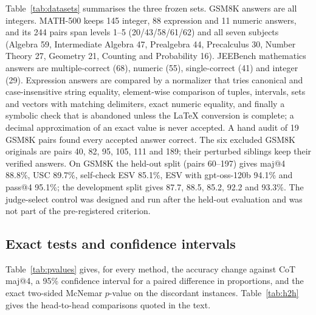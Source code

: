 \documentclass[letterpaper]{article} %
\begin{document}
Table~\ref{tab:datasets} summarises the three frozen sets.
GSM8K answers are all integers. MATH-500 keeps 145 integer, 88 expression and 11 numeric answers, and its 244 pairs span levels 1--5 (20/43/58/61/62) and all seven subjects (Algebra 59, Intermediate Algebra 47, Prealgebra 44, Precalculus 30, Number Theory 27, Geometry 21, Counting and Probability 16). JEEBench mathematics answers are multiple-correct (68), numeric (55), single-correct (41) and integer (29). Expression answers are compared by a normalizer that tries canonical and case-insensitive string equality, element-wise comparison of tuples, intervals, sets and vectors with matching delimiters, exact numeric equality, and finally a symbolic check that is abandoned unless the \LaTeX{} conversion is complete; a decimal approximation of an exact value is never accepted. A hand audit of 19 GSM8K pairs found every accepted answer correct. The six excluded GSM8K originals are pairs 40, 82, 95, 105, 111 and 189; their perturbed siblings keep their verified answers. On GSM8K the held-out split (pairs 60--197) gives maj@4 88.8\%, USC 89.7\%, self-check ESV 85.1\%, ESV with gpt-oss-120b 94.1\% and pass@4 95.1\%; the development split gives 87.7, 88.5, 85.2, 92.2 and 93.3\%. The judge-select control was designed and run after the held-out evaluation and was not part of the pre-registered criterion.

\subsection{Exact tests and confidence intervals}
\label{app:pvalues}

Table~\ref{tab:pvalues} gives, for every method, the accuracy change against CoT maj@4, a 95\% confidence interval for a paired difference in proportions, and the exact two-sided McNemar $p$-value on the discordant instances. Table~\ref{tab:h2h} gives the head-to-head comparisons quoted in the text.
\end{document}
